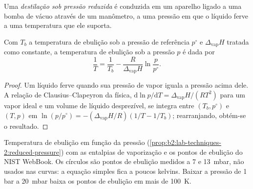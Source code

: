 \begin{definition}\label{def:b2:lab-techniques-2:reduced-pressure}
Uma \emph{destilação sob pressão reduzida} é conduzida
em um aparelho ligado a uma bomba de vácuo através de um manômetro, a uma pressão em que o líquido ferve
a uma temperatura que ele suporta.
\end{definition}

\begin{proposition}\label{prop:b2:lab-techniques-2:reduced-pressure}
Com $T_b$ a temperatura de ebulição sob a pressão de referência $p^\circ$ e $\Delta_{\mathrm{vap}}H$
tratada como constante, a temperatura de ebulição sob a pressão $p$ é dada por
\begin{equation*}
\frac{1}{T} = \frac{1}{T_b} - \frac{R}{\Delta_{\mathrm{vap}}H}\ln\frac{p}{p^\circ}.
\end{equation*}
\end{proposition}

\begin{proof}
Um líquido ferve quando sua pressão de vapor iguala a pressão acima dele. A relação de Clausius--Clapeyron
da física, $\mathrm d\ln p/\mathrm dT = \Delta_{\mathrm{vap}}H/(RT^2)$ para um vapor ideal e um volume de
líquido desprezível, se integra entre $(T_b, p^\circ)$ e $(T, p)$ em $\ln(p/p^\circ) =
-(\Delta_{\mathrm{vap}}H/R)(1/T - 1/T_b)$; rearranjando, obtém-se o resultado.
\end{proof}

\begin{omfigure}

{\small Temperatura de ebulição em função da pressão (\cref{prop:b2:lab-techniques-2:reduced-pressure})
com as entalpias de vaporização e os pontos de ebulição do NIST WebBook. Os círculos são pontos de
ebulição medidos a 7 e \qty{13}{mbar}, não usados nas curvas: a equação simples fica a poucos kelvins.
Baixar a pressão de 1 bar a \qty{20}{mbar} baixa os pontos de ebulição em mais de
\qty{100}{K}.}
\end{omfigure}


